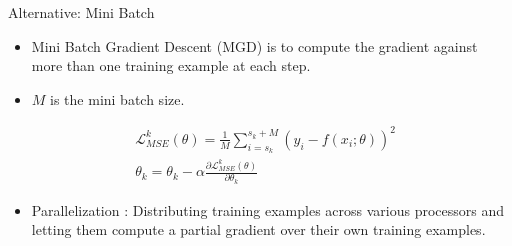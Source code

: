 \begin{frame}{Alternative: Mini Batch}
  \begin{itemize}
    \item{Mini Batch Gradient Descent (MGD) is to compute the gradient against more than one training example at each step.}
    \item{$M$ is the mini batch size.}
  \end{itemize}
  \begin{align*}
    & \mathcal{L}^k_{MSE}(\theta)=\frac{1}{M}\sum_{i=s_k}^{s_k+M}(y_i-f(x_i;\theta))^2\\    
       & \theta_k=\theta_k - \alpha\frac{\partial\mathcal{L}^k_{MSE}(\theta)}{\partial\theta_k}
    \end{align*}
    \begin{itemize}
    \item{Parallelization : Distributing training examples across various processors and letting them compute a partial gradient over their own training examples.}
    \end{itemize}
\end{frame}


